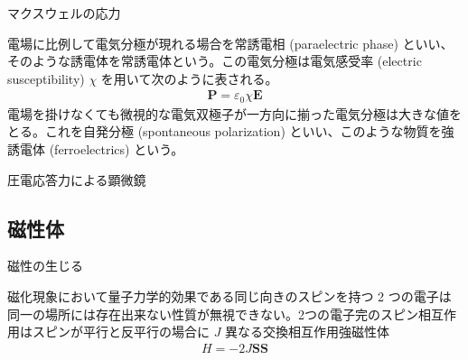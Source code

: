 \documentclass[uplatex,dvipdfmx,a4paper,11pt]{jlreq}
\newcommand{\EE}{\bm{E}}
\renewcommand{\SS}{\bm{S}}
\numberwithin{equation}{section}
\theoremstyle{definition}
\begin{document}
\begin{theorem}
  マクスウェルの応力
\end{theorem}

\begin{proposition}[真電荷の周囲を誘電体で囲む]

\end{proposition}
\begin{proposition}[コンデンサーの極板]

\end{proposition}

\begin{definition}[常誘電体]
  電場に比例して電気分極が現れる場合を常誘電相 (paraelectric phase) といい、そのような誘電体を常誘電体という。この電気分極は電気感受率 (electric susceptibility) $\chi$ を用いて次のように表される。
  \begin{align}
    \bm{P} = \varepsilon_0\chi\EE
  \end{align}
  電場を掛けなくても微視的な電気双極子が一方向に揃った電気分極は大きな値をとる。これを自発分極 (spontaneous polarization) といい、このような物質を強誘電体 (ferroelectrics) という。
\end{definition}

圧電応答力による顕微鏡

\subsection{磁性体}
磁性の生じる
\begin{definition}[強磁性体]
  磁化現象において量子力学的効果である同じ向きのスピンを持つ 2 つの電子は同一の場所には存在出来ない性質が無視できない。2つの電子完のスピン相互作用はスピンが平行と反平行の場合に $J$ 異なる交換相互作用強磁性体
  \begin{align}
    H = -2J\SS\SS
  \end{align}
\end{definition}
\end{document}

